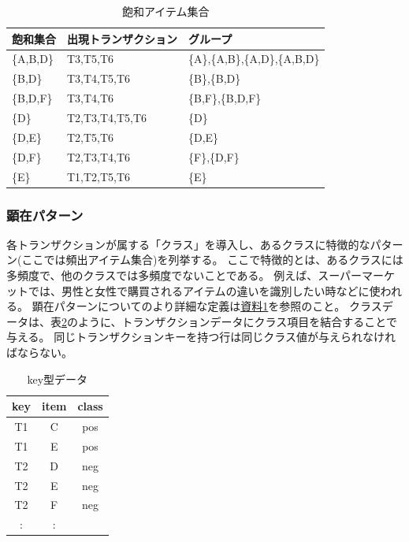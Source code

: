 \begin{table}[htbp]
\begin{center}

\caption{飽和アイテム集合\label{tbl:close}}
{\small
\begin{tabular}{lll}
\hline
飽和集合&出現トランザクション&グループ \\
\hline
\{A,B,D\} & T3,T5,T6       & \{A\},\{A,B\},\{A,D\},\{A,B,D\} \\
\{B,D\}   & T3,T4,T5,T6    & \{B\},\{B,D\}  \\
\{B,D,F\} & T3,T4,T6       & \{B,F\},\{B,D,F\} \\
\{D\}     & T2,T3,T4,T5,T6 & \{D\} \\
\{D,E\}   & T2,T5,T6       & \{D,E\}    \\
\{D,F\}   & T2,T3,T4,T6    & \{F\},\{D,F\} \\
\{E\}     & T1,T2,T5,T6    & \{E\} \\ \hline
\end{tabular} 
}

\end{center}
\end{table} 

\subsubsection{顕在パターン}
各トランザクションが属する「クラス」を導入し、あるクラスに特徴的なパターン(ここでは頻出アイテム集合)を列挙する。
ここで特徴的とは、あるクラスには多頻度で、他のクラスでは多頻度でないことである。
例えば、スーパーマーケットでは、男性と女性で購買されるアイテムの違いを識別したい時などに使われる。
顕在パターンについてのより詳細な定義は\hyperref[sect:ep]{資料1}を参照のこと。
クラスデータは、表\ref{tbl:class}のように、トランザクションデータにクラス項目を結合することで与える。
同じトランザクションキーを持つ行は同じクラス値が与えられなければならない。

\begin{table}[htbp]
\begin{center}
\caption{key型データ\label{tbl:class}}
{\small
\begin{tabular}{ccc}
\hline
key&item&class \\
\hline
T1&C&pos \\
T1&E&pos \\
T2&D&neg \\
T2&E&neg \\
T2&F&neg \\
:&: \\ \hline
\end{tabular}
}
\end{center}
\end{table}

